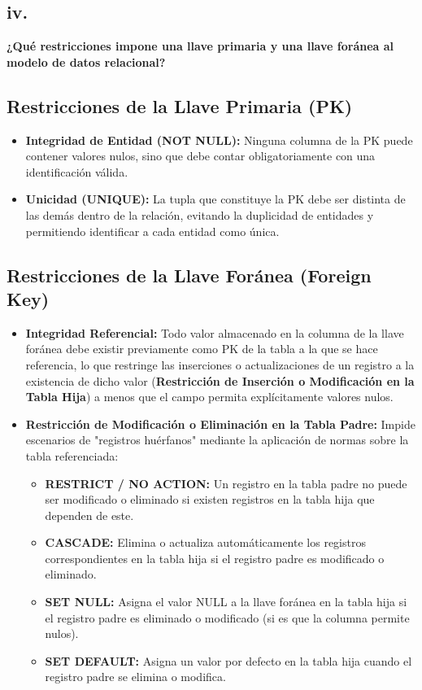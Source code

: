 \subsection*{iv. }

    
\textbf{¿Qué restricciones impone una llave primaria y una llave foránea al modelo de datos relacional?}
\subsection*{Restricciones de la Llave Primaria (PK)}
\begin{itemize}
    \item \textbf{Integridad de Entidad (NOT NULL):} Ninguna columna de la PK puede contener valores nulos, sino que debe contar obligatoriamente con una identificación válida.

    \item \textbf{Unicidad (UNIQUE):} La tupla que constituye la PK debe ser distinta de las demás dentro de la relación, evitando la duplicidad de entidades y permitiendo identificar a cada entidad como única.
\end{itemize}

\subsection*{Restricciones de la Llave Foránea (Foreign Key)}

\begin{itemize}
    \item \textbf{Integridad Referencial:} Todo valor almacenado en la columna de la llave foránea debe existir previamente como PK de la tabla a la que se hace referencia, lo que restringe las inserciones o actualizaciones de un registro a la existencia de dicho valor (\textbf{Restricción de Inserción o Modificación en la Tabla Hija}) a menos que el campo permita explícitamente valores nulos.
    \item \textbf{Restricción de Modificación o Eliminación en la Tabla Padre:} Impide escenarios de "registros huérfanos" mediante la aplicación de normas sobre la tabla referenciada:
    \begin{itemize}
        \item \textbf{RESTRICT / NO ACTION:} Un registro en la tabla padre no puede ser modificado o eliminado si existen registros en la tabla hija que dependen de este.
        \item \textbf{CASCADE:} Elimina o actualiza automáticamente los registros correspondientes en la tabla hija si el registro padre es modificado o eliminado.
        \item \textbf{SET NULL:} Asigna el valor NULL a la llave foránea en la tabla hija si el registro padre es eliminado o modificado (si es que la columna permite nulos).
        \item \textbf{SET DEFAULT:} Asigna un valor por defecto en la tabla hija cuando el registro padre se elimina o modifica.
    \end{itemize}
\end{itemize}
